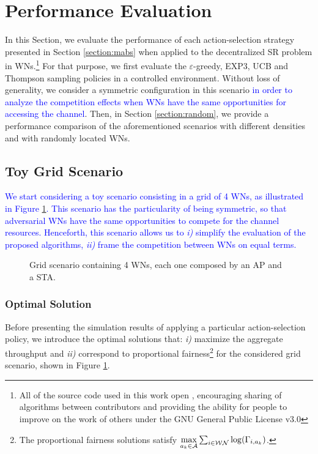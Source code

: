 \documentclass[preprint,12pt]{elsarticle}
\newcommand{\francesc}[1]{\textcolor{blue}{#1}}
\begin{document}
\section{Performance Evaluation}
\label{section:performance_evaluation}	
In this Section, we evaluate the performance of each action-selection strategy presented in Section \ref{section:mabs} when applied to the decentralized SR problem in WNs.\footnote{All of the source code used in this work open \cite{fwilhelmi2017code}, encouraging sharing of algorithms between contributors and providing the ability for people to improve on the work of others under the GNU General Public License v3.0} For that purpose, we first evaluate the $\varepsilon$-greedy, EXP3, UCB and Thompson sampling policies in a controlled environment. Without loss of generality, we consider a symmetric configuration in this scenario \francesc{in order to analyze the competition effects when WNs have the same opportunities for accessing the channel}. Then, in Section \ref{section:random}, we provide a performance comparison of the aforementioned scenarios with different densities and with randomly located WNs.	

\subsection{Toy Grid Scenario}		
\label{section:toy_grid_scenario}	
\francesc{We start considering a toy scenario consisting in a grid of 4 WNs, as illustrated in Figure \ref{fig:scenario}. This scenario has the particularity of being symmetric, so that adversarial WNs have the same opportunities to compete for the channel resources. Henceforth, this scenario allows us to \emph{i)} simplify the evaluation of the proposed algorithms, \emph{ii)} frame the competition between WNs on equal terms.}

\begin{figure}[t!]
	\centering											
	\caption{Grid scenario containing 4 WNs, each one composed by an AP and a STA.}
	\label{fig:scenario}
\end{figure}

\subsubsection{Optimal Solution}
\label{section:optimal_solution}	
Before presenting the simulation results of applying a particular action-selection policy, we introduce the optimal solutions that: \emph{i)} maximize the aggregate throughput and \emph{ii)} correspond to proportional fairness\footnote{The proportional fairness solutions satisfy $\underset{a_k \in \mathcal{A}}{\rm max} \sum_{i \in \mathcal{WN}} \log(\Gamma_{i,a_k})$.} for the considered grid scenario, shown in Figure \ref{fig:scenario}.  %
\end{document}
